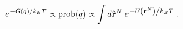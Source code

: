 \documentclass{minimal}
\newcommand{\rn}{\mathbf{r}^N}
\newcommand{\rnhat}{\mathbf{\hat{r}}^N}
\begin{document}
\begin{equation}
e^{ \left. -G(q) \right/ k_B T} \propto
  \mathrm{prob} (q) \propto
  \int d\rnhat \; e^{ \left. -U \left(\rn \right) \right/ k_B T} 
   \; .
\label{gofq}
\end{equation}
\end{document}
